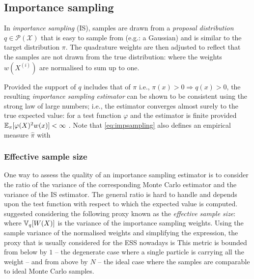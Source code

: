 \subsection{Importance sampling}
In \emph{importance sampling} (IS), samples are drawn from a \emph{proposal distribution} $q\in\mathcal P(\mathcal X)$ that is easy to sample from (e.g.: a Gaussian) and is similar to the target distribution $\pi$. 
The quadrature weights are then adjusted to reflect that the samples are not drawn from the true distribution:
%
%
where the weights $w(X^{(i)})$ are normalised to sum up to one.

Provided the support of $q$ includes that of $\pi$ i.e., $\pi(x)>0\Rightarrow q(x)>0$, the resulting \emph{importance sampling estimator} can be shown to be consistent using the strong law of large numbers; i.e., the estimator converges almost surely to the true expected value:
%
%
for a test function $\varphi$ and the estimator is finite provided $\mathbb E_{\pi}[\varphi(X)^{2}w(x)]<\infty$ \citep[chapter 3.3]{robert04}. Note that \eqref{eq:impsampling} also defines an empirical measure $\hat\pi$ with
%
%
 

\subsubsection{Effective sample size}
One way to assess the quality of an importance sampling estimator is to consider the ratio of the variance of the corresponding Monte Carlo estimator and the variance of the IS estimator. The general ratio is hard to handle and depends upon the test function with respect to which the expected value is computed. \citet{kong92} suggested considering the following proxy known as the \emph{effective sample size}:
%
%
where $\mathbb V_{q}[W(X)]$ is the variance of the importance sampling weights. Using the sample variance of the normalised weights and simplifying the expression, the proxy that is usually considered for the ESS nowadays is
%
%
This metric is bounded from below by $1$ -- the degenerate case where a single particle is carrying all the weight -- and from above by $N$ -- the ideal case where the samples are comparable to ideal Monte Carlo samples. 

